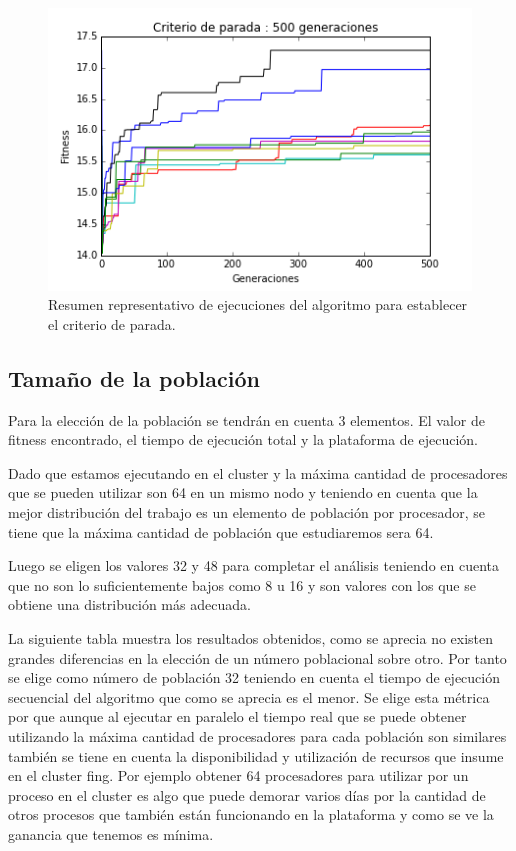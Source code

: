 \begin{figure}[h]
\centering
\includegraphics[width=0.7\linewidth]{Figures/criterio_parada}
\caption{Resumen representativo de ejecuciones del algoritmo para establecer el criterio de parada.}
\label{fig:criterio_parada}
\end{figure}



\subsection{Tamaño de la población}

Para la elección de la población se tendrán en cuenta 3 elementos. El valor de fitness encontrado, el tiempo de ejecución total y la plataforma de ejecución.

Dado que estamos ejecutando en el cluster y la máxima cantidad de procesadores que se pueden utilizar son 64 en un mismo nodo y teniendo en cuenta que la mejor distribución del trabajo es un elemento de población por procesador, se tiene que la máxima cantidad de población que estudiaremos sera 64.

Luego se eligen los valores 32 y 48 para completar el análisis teniendo en cuenta que no son lo suficientemente bajos como 8 u 16 y son valores con los que se obtiene una distribución más adecuada.

La siguiente tabla muestra los resultados obtenidos, como se aprecia no existen grandes diferencias en la elección de un número poblacional sobre otro. Por tanto se elige como número de población 32 teniendo en cuenta el tiempo de ejecución secuencial del algoritmo que como se aprecia es el menor. Se elige esta métrica por que aunque al ejecutar en paralelo el tiempo real que se puede obtener utilizando la máxima cantidad de procesadores para cada población son similares también se tiene en cuenta la disponibilidad y utilización de recursos que insume en el cluster fing. Por ejemplo obtener 64 procesadores para utilizar por un proceso en el cluster es algo que puede demorar varios días por la cantidad de otros procesos que también están funcionando en la plataforma y como se ve la ganancia que tenemos es mínima.

